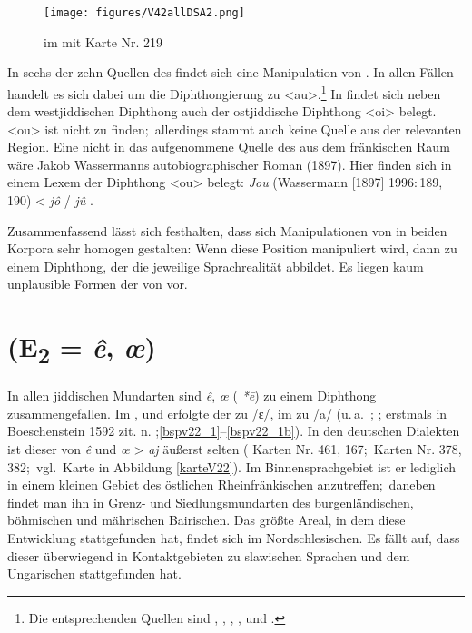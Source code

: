  
  \begin{figure}
		\centering
\texttt{[image: figures/V42allDSA2.png]}
		\caption{\label{karteV42}   im  mit  Karte Nr. 219}
		\end{figure}

 


   
\newpage    
 In sechs der zehn Quellen des  findet sich eine Manipulation von . In allen Fällen handelt es sich dabei um die Diphthongierung zu  <au>.\footnote{Die entsprechenden Quellen sind , , , ,  und .} In  findet sich neben dem westjiddischen Diph\-thong auch der ostjiddische Diph\-thong  <oi> belegt. <ou> ist nicht zu finden;\, allerdings stammt auch keine Quelle aus der relevanten Region. Eine nicht in das  aufgenommene Quelle des  aus dem fränkischen Raum wäre Jakob Wassermanns autobiographischer Roman  (1897). Hier finden sich in einem Lexem der Diphthong <ou> belegt: \textit{Jou} (Wassermann [1897] 1996:\,189, 190)  < {\mhd} \textit{jô} / \textit{jû} \parencite[Bd. 1, Sp. 1481]{Lexer1992}.
 


\noindent Zusammenfassend lässt sich festhalten, dass sich Manipulationen von  in beiden Korpora sehr homogen gestalten: Wenn diese Position manipuliert wird, dann zu einem Diphthong, der die jeweilige Sprachrealität abbildet. Es liegen kaum unplausible Formen der  von  vor. 
 

 \section{ (E\textsubscript{2} = {\mhd} \textit{ê}, \textit{œ})}\label{phonV22}
\largerpage[-1]
 In allen jiddischen Mundarten sind {\mhd} \textit{ê}, \textit{œ} ({\urj} \textit{*\=e\textlengthmark}) zu einem Diphthong zusammengefallen. Im \hai{{\WJ}}, \hai{{\SOJ}} und \hai{{\NOJ}} erfolgte der  zu /ɛ\textsubarch{\textsci}/, im \hai{{\ZOJ}} zu /a\textsubarch{\textsci}/ (u.\,a.\,  \cite[72]{Herzog1992}; \citealt{Timm1987,Beider2010}; erstmals in Boeschenstein 1592 zit. n. \citealt[3]{Mieses1915};\ref{bspv22_1}–\ref{bspv22_1b}). In den deutschen Dialekten ist dieser  von {\mhd} \textit{ê} und \textit{œ} > \textit{aj} äußerst selten ( Karten Nr. 461, 167;\,  Karten Nr. 378, 382;\, vgl.\, Karte in Abbildung \ref{karteV22}). Im Binnensprachgebiet ist er lediglich in einem kleinen Gebiet des östlichen Rheinfränkischen anzutreffen;\, daneben findet man ihn in Grenz- und Siedlungsmundarten des burgenländischen, böhmischen und mährischen Bairischen. Das größte Areal, in dem diese Entwicklung stattgefunden hat, findet sich im Nordschlesischen. Es fällt auf, dass dieser  überwiegend in Kontaktgebieten zu slawischen Sprachen und dem Ungarischen stattgefunden hat.
 

